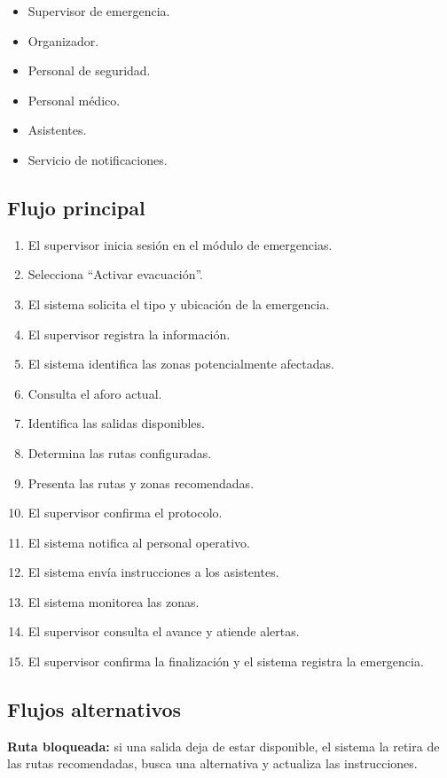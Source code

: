 \documentclass[12pt,a4paper]{article}
\begin{document}
\begin{itemize}
\item Supervisor de emergencia.
\item Organizador.
\item Personal de seguridad.
\item Personal médico.
\item Asistentes.
\item Servicio de notificaciones.
\end{itemize}

\subsection{Flujo principal}

\begin{enumerate}
\item El supervisor inicia sesión en el módulo de emergencias.
\item Selecciona ``Activar evacuación''.
\item El sistema solicita el tipo y ubicación de la emergencia.
\item El supervisor registra la información.
\item El sistema identifica las zonas potencialmente afectadas.
\item Consulta el aforo actual.
\item Identifica las salidas disponibles.
\item Determina las rutas configuradas.
\item Presenta las rutas y zonas recomendadas.
\item El supervisor confirma el protocolo.
\item El sistema notifica al personal operativo.
\item El sistema envía instrucciones a los asistentes.
\item El sistema monitorea las zonas.
\item El supervisor consulta el avance y atiende alertas.
\item El supervisor confirma la finalización y el sistema registra la emergencia.
\end{enumerate}

\subsection{Flujos alternativos}

\textbf{Ruta bloqueada:} si una salida deja de estar disponible, el sistema la retira de las rutas recomendadas, busca una alternativa y actualiza las instrucciones.
\end{document}
